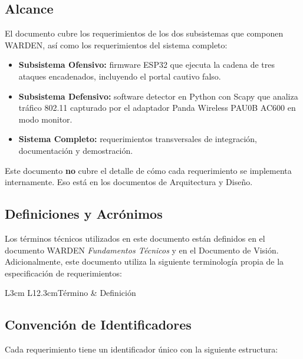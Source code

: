 \documentclass[11pt,a4paper]{article}
\begin{document}
\subsection{Alcance}
El documento cubre los requerimientos de los dos subsistemas que componen
WARDEN, así como los requerimientos del sistema completo:

\begin{itemize}
  \item \textbf{Subsistema Ofensivo:} firmware ESP32 que ejecuta la cadena
    de tres ataques encadenados, incluyendo el portal cautivo falso.
  \item \textbf{Subsistema Defensivo:} software detector en Python con
    Scapy que analiza tráfico 802.11 capturado por el adaptador Panda
    Wireless PAU0B AC600 en modo monitor.
  \item \textbf{Sistema Completo:} requerimientos transversales de
    integración, documentación y demostración.
\end{itemize}

Este documento \textbf{no} cubre el detalle de cómo cada requerimiento se
implementa internamente. Eso está en los documentos de Arquitectura y
Diseño.

\subsection{Definiciones y Acrónimos}
Los términos técnicos utilizados en este documento están definidos en el
documento WARDEN \emph{Fundamentos Técnicos} y en el Documento de Visión.
Adicionalmente, este documento utiliza la siguiente terminología propia
de la especificación de requerimientos:

\begin{datatable}{L{3cm} L{12.3cm}}{Término & Definición}
\end{datatable}

\subsection{Convención de Identificadores}
Cada requerimiento tiene un identificador único con la siguiente estructura:
\end{document}
